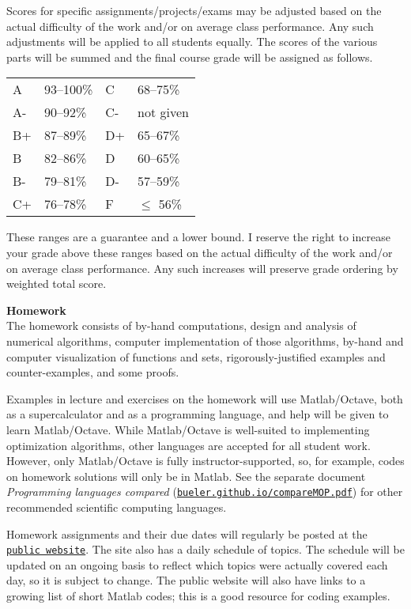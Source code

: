 \documentclass[12pt]{article}
\renewcommand{\emph}[1]{\textsf{\textbf{#1}}}
\newcommand{\localhead}[1]{\par\smallskip\textbf{#1} \smallskip\nobreak\\}%
\def\heading#1{\localhead{\large\emph{#1}}}
\begin{document}
Scores for specific assignments/projects/exams may be adjusted based on the actual difficulty of the work and/or on average class performance.  Any such adjustments will be applied to all students equally.  The scores of the various parts will be summed and the final course grade will be assigned as follows.

\begin{tabular}{llll}
A  & 93--100\%& C  & 68--75\%  \\
A- & 90--92\% & C- & not given \\
B+ & 87--89\% & D+ & 65--67\%  \\
B  & 82--86\% & D  & 60--65\%  \\
B- & 79--81\% & D- & 57--59\%  \\
C+ & 76--78\% & F  & $\le$ 56\%
\end{tabular}

These ranges are a guarantee and a lower bound.  I reserve the right to increase your grade above these ranges based on the actual difficulty of the work and/or on average class performance.  Any such increases will preserve grade ordering by weighted total score.


\clearpage\newpage
\strut\vspace{-10pt}

\heading{Homework}
The homework consists of by-hand computations, design and analysis of numerical algorithms, computer implementation of those algorithms, by-hand and computer visualization of functions and sets, rigorously-justified examples and counter-examples, and some proofs.

Examples in lecture and exercises on the homework will use Matlab/Octave, both as a supercalculator and as a programming language, and help will be given to learn Matlab/Octave.  While Matlab/Octave is well-suited to implementing optimization algorithms, other languages are accepted for all student work.  However, only Matlab/Octave is fully instructor-supported, so, for example, codes on homework solutions will only be in Matlab.  See the separate document \textsl{Programming languages compared} (\href{https://bueler.github.io/compareMOP.pdf}{\texttt{bueler.github.io/compareMOP.pdf}}) for other recommended scientific computing languages.

Homework assignments and their due dates will regularly be posted at the \href{https://bueler.github.io/nade/}{\texttt{public website}}.  The site also has a daily schedule of topics.  The schedule will be updated on an ongoing basis to reflect which topics were actually covered each day, so it is subject to change.  The public website will also have links to a growing list of short Matlab codes; this is a good resource for coding examples.
\end{document}
